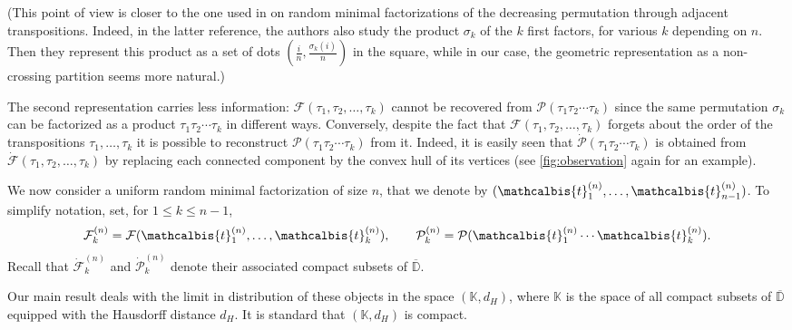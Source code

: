 \documentclass[AHL,XML,longabstracts,Unicode]{cedram}
\newcommand{\D}{\mathbb{D}}
\def\PPP{\mathcal P}
\def\FFF{\mathcal F}
\def\tb{\mathcalbis{t}}
\begin{document}
(This point of view is closer to the one used in \cite{AHRV07} on random minimal factorizations
of the decreasing permutation through adjacent transpositions.
Indeed, in the latter reference, the authors also study the product $\sigma_k$ of the $k$ first factors, for various $k$ depending on $n$.
Then they represent this product as a set of dots $(\tfrac{i}{n},\tfrac{\sigma_k(i)}{n})$ in the square,
while in our case, the geometric representation as a non-crossing partition seems more natural.)

The second representation carries less information:
$\FFF(\tau_{1}, \tau_{2}, \ldots, \tau_{k})$ cannot be recovered from $\PPP(\tau_{1} \tau_{2}\cdots \tau_{k})$
since the same permutation $\sigma_k$ can be factorized as a product $\tau_{1} \tau_{2}\cdots \tau_{k}$ in different ways.
Conversely, despite the fact that $\FFF(\tau_{1}, \tau_{2}, \ldots, \tau_{k})$ forgets about
the order of the transpositions $\tau_1,\dots,\tau_k$ it is possible to reconstruct $\PPP(\tau_{1} \tau_{2}\cdots \tau_{k})$
from it.
Indeed,
it is easily seen that $ \dot{\PPP}(\tau_{1} \tau_{2}\cdots \tau_{k})$ is obtained from
$\dot{\FFF}(\tau_{1} ,\tau_{2} ,\ldots ,\tau_{k})$ by replacing each connected component by the convex hull of its vertices (see \cref{fig:observation} again for an example).

We now consider a uniform random minimal factorization of size $n$, that we denote by
$(\tb_{1}^{(n)}, \ldots, \tb_{n-1}^{(n)})$.
To simplify notation, set, for $1 \leq k \leq n-1$,
\[ \FFF^{(n)}_{k}= \FFF ( \tb_{1}^{(n)}, \ldots, \tb_{k}^{(n)} ), \qquad  \PPP^{(n)}_{k}= \PPP ( \tb_{1}^{(n)}  \cdots \tb_{k}^{(n)} ).\]
Recall that  $\dot{\FFF}^{(n)}_{k}$ and $ \dot{\PPP}^{(n)}_{k}$ denote their associated compact subsets of $\overline{\D}$.

Our main result deals with the limit in distribution of these objects in the space  $(\mathbb{K},d_{H})$, where  $\mathbb{K}$ is the space of all compact subsets of $\overline{\D}$  equipped with the Hausdorff distance $d_{H}$. It is standard that $(\mathbb{K},d_{H})$ is compact.
\end{document}

